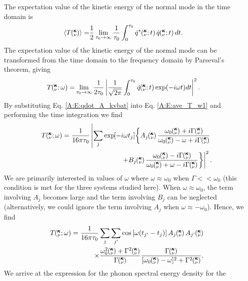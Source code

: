 The expectation value of the kinetic energy of the normal mode in the time 
domain is
\begin{equation}\label{A:E:ave_T_t}
\begin{split}
\langle T\kv \rangle=&\frac{1}{2}\lim_{\tau_0\rightarrow\infty}
\frac{1}{\tau_0}\int_{0}^{\tau_0}\dot{q}^*\kvt\dot{q}\kvt dt.
\end{split}
\end{equation}
The expectation value of the kinetic energy of the normal mode can 
be transformed from the time domain to the
frequency domain by Parseval's theorem,\cite{rudin_real_1987} giving
\begin{equation}\label{A:E:ave_T_w1}
\begin{split}
T\mspace{-4.0mu}\left(\mspace{-8.0mu} \begin{smallmatrix}&\pmb{\kappa} \\&\nu \end{smallmatrix}\mspace{-2.0mu};\omega\right)=&\lim_{\tau_0\rightarrow\infty}\frac{1}{2\tau_0}
\left|\frac{1}{\sqrt{2\pi}}\int_{0}^{\tau_0}\dot{q}\mspace{-4.0mu}\left(\mspace{-8.0mu} \begin{smallmatrix}&\pmb{\kappa} \\&\nu \end{smallmatrix}\mspace{-2.0mu};t\right)
\exp(-i\omega t)dt\right|^2.
\end{split}
\end{equation}
By substituting Eq$.$ \eqref{A:E:qdot_A_kvbat} into Eq$.$ 
\eqref{A:E:ave_T_w1} and performing the time integration we find
\begin{equation}\label{A:E:ave_T_w_int}
\begin{split}
T\kvw = \frac{1}{16\pi\tau_0}\left|\sum_j\EXP{-i\omega t_j} 
\left\{A_j\kv\frac{\omega_0\kv+i\Gamma\kv}{\omega_0\kv-\omega+i\Gamma\kv}
\right.\right.\\
\left.\left.+B_j\kv\frac{\omega_0\kv-i\Gamma\kv}
{\omega_0\kv+\omega-i\Gamma\kv}\right\}\right|^2.
\end{split}
\end{equation}
We are primarily interested in values of $\omega$ where 
$\omega\approx\omega_0$ when $\Gamma<<\omega_0$ (this condition is 
met for the three systems studied here).  When $\omega\approx\omega_0$, 
the term involving $A_j$ becomes large and the term involving $B_j$ can 
be neglected (alternatively, we could ignore the term involving $A_j$ 
when $\omega\approx-\omega_0$).  Hence, we find
\begin{equation}\label{A:E:ave_T_w_approx}
\begin{split}
T\kvw=\frac{1}{16\pi\tau_0}\sum_j\sum_{j'}\cos\left[\omega (t_{j'}-t_j)
\right]A_j\kv A_{j'}\kv\\
\times\frac{\omega_0^2\kv+\Gamma^2\kv}{\Gamma\kv}\frac{\Gamma\kv}
{[\omega_0\kv-\omega]^2+\Gamma^2\kv}.
\end{split}
\end{equation}
We arrive at the expression for the phonon spectral energy density for the 
